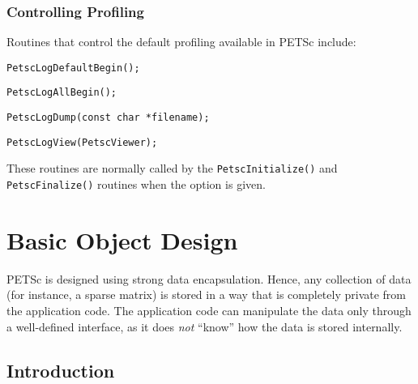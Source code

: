 \subsection{Controlling Profiling}

Routines that control the default profiling available in PETSc include:
\begin{tightitemize}
  \item\lstinline{PetscLogDefaultBegin();}
  \item\lstinline{PetscLogAllBegin();}
  \item\lstinline{PetscLogDump(const char *filename);}
  \item\lstinline{PetscLogView(PetscViewer);}
\end{tightitemize}
These routines are normally called by the \lstinline{PetscInitialize()}
and \lstinline{PetscFinalize()} routines when the option
 is given.

\chapter{Basic Object Design}
\label{chapter:design}

PETSc is designed using strong data encapsulation.  Hence,
any collection of data (for instance, a sparse matrix) is stored in
a way that is completely private from the application code. The application
code can manipulate the data only through a well-defined interface, as it
does {\em not} ``know'' how the data is stored internally.

\section{Introduction}

